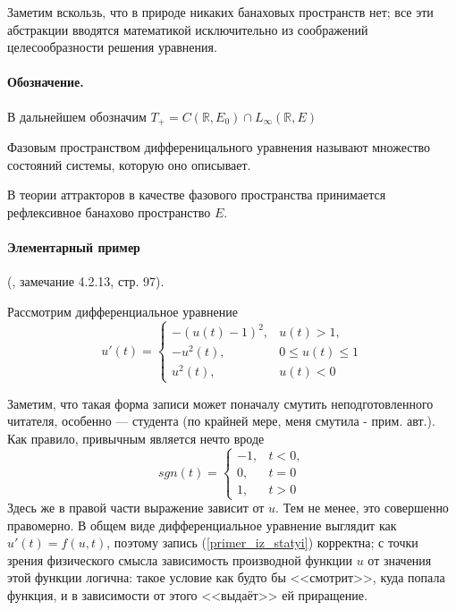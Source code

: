 Заметим вскользь, что в природе никаких банаховых пространств нет; все эти абстракции вводятся математикой исключительно из соображений целесообразности решения уравнения.

\paragraph{Обозначение.}
В дальнейшем обозначим $T_+ = C(\mathbb{R},E_0) \cap L_\infty(\mathbb{R},E)$

\opred
Фазовым пространством дифференицального уравнения называют множество состояний системы, которую оно описывает.

В теории аттракторов в качестве фазового пространства принимается рефлексивное банахово пространство $E$.


\paragraph{Элементарный пример} (\cite{Vorotnikov}, замечание 4.2.13, стр. 97).

Рассмотрим дифференциальное уравнение
\begin{equation}\label{primer_iz_statyi}
	u'(t)=
	\left\{
		\begin{array}{ll}
			-(u(t)-1)^2, & u(t) > 1, \\
			-u^2 (t)   , & 0 \leq u(t) \leq 1 \\
			u^2 (t)    , & u(t) < 0
		\end{array}
	\right.
\end{equation}

Заметим, что такая форма записи может поначалу смутить неподготовленного читателя, особенно --- студента (по крайней мере, меня смутила - прим. авт.).
Как правило, привычным является нечто вроде
\begin{equation*}
	sgn(t)=
	\left\{
		\begin{array}{ll}
			-1, & t < 0, \\
			 0, & t = 0 \\
			 1, & t > 0
		\end{array}
	\right.
\end{equation*}
Здесь же в правой части выражение зависит от $u$.
Тем не менее, это совершенно правомерно.
В общем виде дифференциальное уравнение выглядит как $u'(t)=f(u,t)$,
поэтому запись (\ref{primer_iz_statyi}) корректна;
с точки зрения физического смысла зависимость производной функции $u$ от значения этой функции логична:
такое условие как будто бы <<смотрит>>, куда попала функция, и в зависимости от этого <<выдаёт>> ей приращение.


